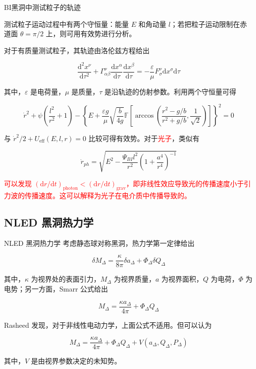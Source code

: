 \documentclass[9pt, dvipsnames]{beamer} %
\begin{document}
\begin{frame}{BI黑洞中测试粒子的轨迹}

    测试粒子运动过程中有两个守恒量：能量 $E$ 和角动量 $l$；若把粒子运动限制在赤道面 $\theta=\pi/2$ 上，则可用有效势进行分析。

    对于有质量测试粒子，其轨迹由洛伦兹方程给出

    $$
    \frac{\mathrm{d}^2 x^\nu }{\mathrm{d}\tau^2 } + \Gamma_{\alpha\beta}^\nu \frac{\mathrm{d}x^\alpha }{\mathrm{d}\tau } \frac{\mathrm{d}x^\beta }{\mathrm{d}\tau } 
    =-\frac{\varepsilon }{\mu } F_{\sigma}^{\nu} \mathrm{d}x^\sigma \mathrm{d}\tau
    $$

    其中，$\varepsilon$ 是电荷量，$\mu$ 是质量，$\tau$ 是沿轨迹的仿射参数。利用两个守恒量可得

    $$
    \dot{r}^2 + \psi\left(\frac{l^2 }{r^2 } + 1 \right) - \left\{E+\frac{\varepsilon g }{\mu } \sqrt{\frac{b }{4g } } \mathbb{F} \left[\arccos\left(\frac{r^2-g/b }{r^2+g/b }  , \frac{1 }{\sqrt{2} }  \right) \right] \right\}^2=0
    $$

    与 $\dot{r}^2/2+U_{\mathrm{eff}}(E,l,r)=0$ 比较可得有效势。对于\textcolor{red}{光子}，类似有

    $$
    \dot{r}_{ph}
    =\sqrt{E^2 - \frac{\Psi_{BI} l^2 }{r^2 } \left(1+\frac{a^4 }{r^4 }  \right)^{-1}} 
    $$

    \textcolor{red}{可以发现 $(\mathrm{d}r/\mathrm{d}t)_{\mathrm{photon}}<(\mathrm{d}r/\mathrm{d}t)_{\mathrm{grav}}$，即非线性效应导致光的传播速度小于引力波的传播速度。这可以解释为光子在电介质中传播导致的。}
    
\end{frame}

\subsection{NLED 黑洞热力学}

\begin{frame}{NLED 黑洞热力学}
    考虑静态球对称黑洞，热力学第一定律给出

    $$
    \delta M_{\Delta} = \frac{\kappa }{8\pi } \delta a_{\Delta} + \Phi_\Delta \delta Q_\Delta
    $$

    其中，$\kappa$ 为视界处的表面引力，$M_\Delta$ 为视界质量，$a$ 为视界面积，$Q$ 为电荷，$\Phi$ 为电势；另一方面，Smarr 公式给出

    $$
    M_\Delta = \frac{\kappa a_\Delta }{4\pi } + \Phi_\Delta Q_\Delta
    $$

    Rasheed 发现，对于非线性电动力学，上面公式不适用。但可以认为

    $$
    \boxed{
    M_\Delta = \frac{\kappa a_\Delta }{4\pi } + \Phi_\Delta Q_\Delta + V\left(a_\Delta , Q_\Delta , P_\Delta \right)
    }
    $$

    其中，$V$ 是由视界参数决定的未知势。

\end{frame}
\end{document}
